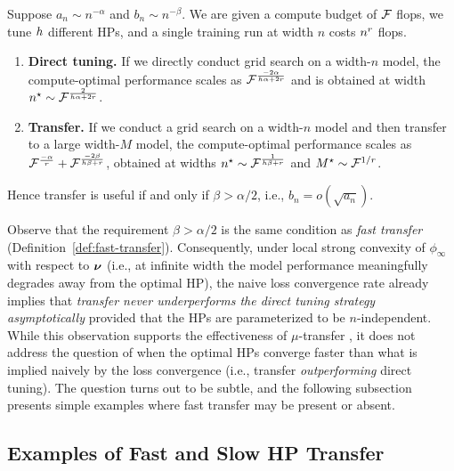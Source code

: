 \begin{theorem}\label{thm:grid_and_transfer_rate}
Suppose $a_n \sim n^{-\alpha}$ and $b_n \sim n^{-\beta}$. We are given a compute budget of $\mathcal{F}$ flops, we tune $h$ different HPs, and a single training run at width $n$ costs $n^{r}$ flops. 
\begin{enumerate}[label=(\alph*),leftmargin=*,]
    \item \textbf{Direct tuning.} If we directly conduct grid search on a width-$n$ model, the compute-optimal performance scales as $\mathcal{F}^{\frac{-2\alpha}{h \alpha + 2 r}}$ and is obtained at width $n^\star \sim \mathcal{F}^{\frac{2}{h \alpha + 2 r}}$.
    \item \textbf{Transfer.} If we conduct a grid search on a width-$n$ model and then transfer to a large width-$M$ model, the compute-optimal performance scales as $\mathcal{F}^{\frac{-\alpha}{r}} + \mathcal{F}^{\frac{-2\beta}{h \beta + r}}$, obtained at widths $n^\star \sim \mathcal{F}^{\frac{1}{h \beta + r}}$ and $M^\star \sim \mathcal{F}^{1/r}$. 
\end{enumerate}
Hence transfer is useful if and only if $\beta > \alpha / 2$, i.e., $b_n = o(\sqrt{a_n})$. 
\end{theorem}

Observe that the requirement $\beta>\alpha/2$ is the same condition as \textit{fast transfer} (Definition~\ref{def:fast-transfer}). Consequently, under local strong convexity of $\phi_\infty$ with respect to $\bm{\nu}$ (i.e., at infinite width the model performance
meaningfully degrades away from the optimal HP), the naive loss convergence rate already implies that \textit{transfer never underperforms the direct tuning strategy asymptotically} provided that the HPs are parameterized to be $n$-independent. 
While this observation supports the effectiveness of $\mu$-transfer \citep{yang2022tensor}, it does not address the question of when the optimal HPs converge faster than what is implied naively by the loss convergence (i.e., transfer \textit{outperforming} direct tuning). The question turns out to be subtle, and the following subsection presents simple examples where fast transfer may be present or absent. 

\subsection{Examples of Fast and Slow HP Transfer}\label{sec:examples}

